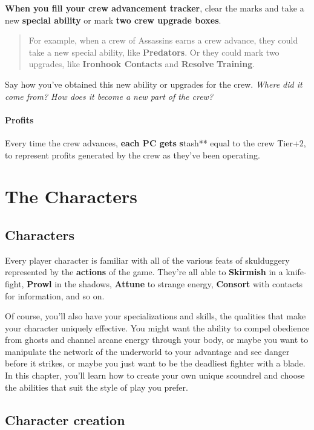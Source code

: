 \documentclass[11pt,oneside]{book}
\newcommand{\gameterm}[1]{\textbf{#1}}
\begin{document}
\textbf{When you fill your crew advancement tracker}, clear the marks and take a new \textbf{special ability }or mark \textbf{two crew upgrade boxes}.

\begin{quote}
	For example, when a crew of Assassins earns a crew advance, they could take a new special ability, like \textbf{Predators}. Or they could mark two upgrades, like \textbf{Ironhook Contacts} and \textbf{Resolve} \textbf{Training}.
\end{quote}

Say how you’ve obtained this new ability or upgrades for the crew. \emph{Where did it come from? How does it become a new part of the crew?}

\subsection{Profits}

Every time the crew advances, \textbf{each PC gets} \textbf{s}tash** equal to the crew Tier+2, to represent profits generated by the crew as they’ve been operating.

\part{The Characters}

\chapter{Characters}

Every player character is familiar with all of the various feats of skulduggery represented by the \textbf{actions} of the game. They’re all able to \gameterm{Skirmish}  in a knife-fight, \gameterm{Prowl}  in the shadows, \gameterm{Attune}  to strange energy, \gameterm{Consort}  with contacts for information, and so on.

Of course, you’ll also have your specializations and skills, the qualities that make your character uniquely effective. You might want the ability to compel obedience from ghosts and channel arcane energy through your body, or maybe you want to manipulate the network of the underworld to your advantage and see danger before it strikes, or maybe you just want to be the deadliest fighter with a blade. In this chapter, you’ll learn how to create your own unique scoundrel and choose the abilities that suit the style of play you prefer.

\chapter{Character creation}
\end{document}
